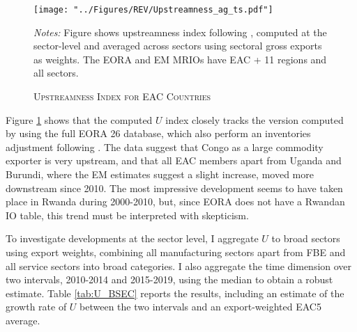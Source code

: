 \documentclass[a4paper]{article}
\begin{document}
\begin{figure}[h!]
\centering
\caption{\label{fig:EACUS_ag_ts}\textsc{Upstreamness Index for EAC Countries}}
\texttt{[image: "../Figures/REV/Upstreamness\_ag\_ts.pdf"]} \\ %
\raggedright
\scriptsize
\emph{Notes:} Figure shows upstreamness index following \citet{antras2012measuring}, computed at the sector-level and averaged across sectors using sectoral gross exports as weights. The EORA and EM MRIOs have EAC + 11 regions and all sectors.  
\vspace{4mm}
\end{figure}
\FloatBarrier



Figure \ref{fig:EACUS_ag_ts} shows that the computed $U$ index closely tracks the version computed by \citet{mancini2023positioning} using the full EORA 26 database, which also perform an inventories adjustment following \citet{antras2018measurement}. The data suggest that Congo as a large commodity exporter is very upstream, and that all EAC members apart from Uganda and Burundi, where the EM estimates suggest a slight increase, moved more downstream since 2010. The most impressive development seems to have taken place in Rwanda during 2000-2010, but, since EORA does not have a Rwandan IO table, this trend must be interpreted with skepticism. \newline

To investigate developments at the sector level, I aggregate $U$ to broad sectors using export weights, combining all manufacturing sectors apart from FBE and all service sectors into broad categories. I also aggregate the time dimension over two intervals, 2010-2014 and 2015-2019, using the median to obtain a robust estimate. Table \ref{tab:U_BSEC} reports the results, including an estimate of the growth rate of $U$ between the two intervals and an export-weighted EAC5 average. \newline 
\end{document}
